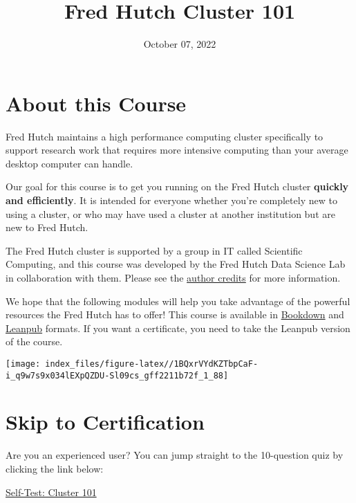 \documentclass[
]{book}
\title{Fred Hutch Cluster 101}
\author{}
\date{\vspace{-2.5em}October 07, 2022}
\begin{document}
\maketitle

{
\setcounter{tocdepth}{1}
\tableofcontents
}
\hypertarget{about-this-course}{%
\chapter*{About this Course}\label{about-this-course}}

Fred Hutch maintains a high performance computing cluster specifically to support research work that requires more intensive computing than your average desktop computer can handle.

Our goal for this course is to get you running on the Fred Hutch cluster \textbf{quickly and efficiently}. It is intended for everyone whether you're completely new to using a cluster, or who may have used a cluster at another institution but are new to Fred Hutch.

The Fred Hutch cluster is supported by a group in IT called Scientific Computing, and this course was developed by the Fred Hutch Data Science Lab in collaboration with them. Please see the \protect\hyperlink{about-the-authors}{author credits} for more information.

We hope that the following modules will help you take advantage of the powerful resources the Fred Hutch has to offer! This course is available in \href{https://hutchdatascience.org/FH_Cluster_Guide}{Bookdown} and \href{https://leanpub.com/courses/fredhutch/fredhutchcluster101}{Leanpub} formats. If you want a certificate, you need to take the Leanpub version of the course.

\texttt{[image: index\_files/figure-latex//1BQxrVYdKZTbpCaF-i\_q9w7s9x034lEXpQZDU-Sl09cs\_gff2211b72f\_1\_88]}

\hypertarget{skip-to-certification}{%
\chapter*{Skip to Certification}\label{skip-to-certification}}

Are you an experienced user? You can jump straight to the 10-question quiz by clicking the link below:

\href{https://leanpub.com/courses/fredhutch/fredhutchcluster101/quizzes/self_test_101}{Self-Test: Cluster 101}
\end{document}
